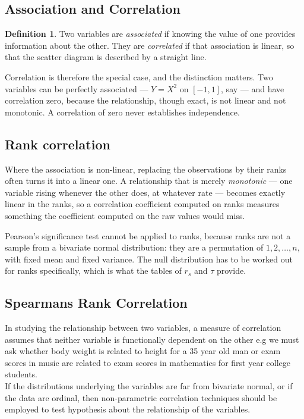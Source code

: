 \documentclass[11pt,a4paper]{article}
\theoremstyle{definition}
\newtheorem{definition}[thm]{Definition}
\begin{document}
\subsection{Association and Correlation}
\begin{definition}
Two variables are \emph{associated} if knowing the value of one provides
information about the other. They are \emph{correlated} if that association is
linear, so that the scatter diagram is described by a straight line.
\end{definition}

Correlation is therefore the special case, and the distinction matters. Two
variables can be perfectly associated --- $Y=X^{2}$ on $[-1,1]$, say --- and have
correlation zero, because the relationship, though exact, is not linear and not
monotonic. A correlation of zero never establishes independence.





\subsection{Rank correlation}
Where the association is non-linear, replacing the observations by their ranks
often turns it into a linear one. A relationship that is merely \emph{monotonic}
--- one variable rising whenever the other does, at whatever rate --- becomes exactly
linear in the ranks, so a correlation coefficient computed on ranks measures
something the coefficient computed on the raw values would miss.

Pearson's significance test cannot be applied to ranks, because ranks are not a
sample from a bivariate normal distribution: they are a permutation of
$1,2,\dots,n$, with fixed mean and fixed variance. The null distribution has to be
worked out for ranks specifically, which is what the tables of $r_s$ and $\tau$
provide.





\subsection{Spearmans Rank Correlation}
In studying the relationship between two variables, a measure of correlation assumes that neither variable is functionally dependent on the other e.g we  must ask whether body weight is related to height for a 35 year old man or exam scores in music are related to exam scores in mathematics for first year college students.\\
If the distributions underlying the variables are far from bivariate normal, or if the data are ordinal, then non-parametric correlation techniques should be employed to test hypothesis about the relationship of the variables.\\
\end{document}

